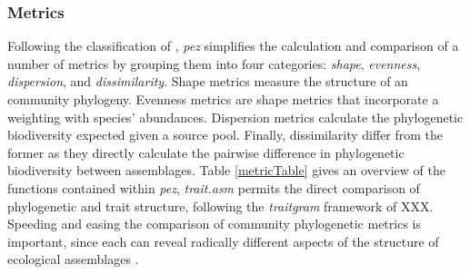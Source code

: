 \documentclass[11pt]{article} %
\begin{document}
\subsubsection*{Metrics}
Following the classification of \textcite{Pearse2014review},
\emph{pez} simplifies the calculation and comparison of a number of
metrics by grouping them into four categories: \emph{shape},
\emph{evenness}, \emph{dispersion}, and \emph{dissimilarity}. Shape metrics measure the structure of an community phylogeny. Evenness metrics are shape metrics that incorporate a weighting with species’ abundances. Dispersion metrics
calculate the phylogenetic biodiversity expected given a source pool. Finally, dissimilarity differ from the former as they directly calculate the pairwise difference in 
phylogenetic biodiversity between assemblages. 
Table \ref{metricTable}
gives an overview of the functions contained within \emph{pez}, \emph{trait.asm}
permits the direct comparison of phylogenetic and trait structure,
following the \emph{traitgram} framework of XXX. Speeding and easing
the comparison of community phylogenetic metrics is important, since
each can reveal radically different aspects of the structure of
ecological assemblages \autocite{Cadotte2010}.
\end{document}
